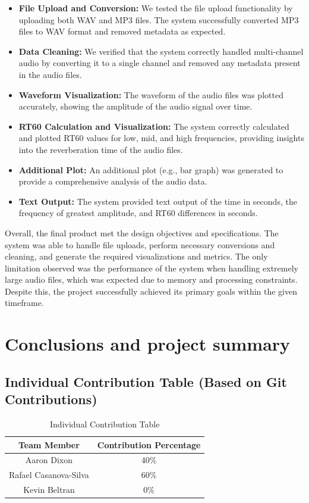 \documentclass[11pt]{article}
\begin{document}
\begin{itemize}
    \item \textbf{File Upload and Conversion:} We tested the file upload functionality by uploading both WAV and MP3 files. The system successfully converted MP3 files to WAV format and removed metadata as expected.
    \item \textbf{Data Cleaning:} We verified that the system correctly handled multi-channel audio by converting it to a single channel and removed any metadata present in the audio files.
    \item \textbf{Waveform Visualization:} The waveform of the audio files was plotted accurately, showing the amplitude of the audio signal over time.
    \item \textbf{RT60 Calculation and Visualization:} The system correctly calculated and plotted RT60 values for low, mid, and high frequencies, providing insights into the reverberation time of the audio files.
    \item \textbf{Additional Plot:} An additional plot (e.g., bar graph) was generated to provide a comprehensive analysis of the audio data.
    \item \textbf{Text Output:} The system provided text output of the time in seconds, the frequency of greatest amplitude, and RT60 differences in seconds.
\end{itemize}

Overall, the final product met the design objectives and specifications. 
The system was able to handle file uploads, perform necessary conversions and 
cleaning, and generate the required visualizations and metrics. The only 
limitation observed was the performance of the system when handling extremely 
large audio files, which was expected due to memory and processing constraints. 
Despite this, the project successfully achieved its primary goals within the 
given timeframe.

\section{Conclusions and project summary}

\subsection{Individual Contribution Table (Based on Git Contributions)}
\begin{table}[h!]
\centering
\caption{Individual Contribution Table}
\begin{tabular}{|c|c|}
\hline
\textbf{Team Member} & \textbf{Contribution Percentage} \\
\hline
Aaron Dixon & 40\% \\
\hline
Rafael Casanova-Silva & 60\% \\
\hline
Kevin Beltran & 0\% \\
\hline
\end{tabular}
\end{table}
\end{document}
